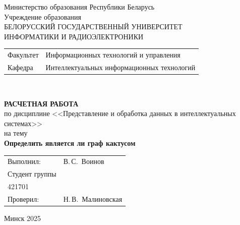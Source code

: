 \begin{titlepage}
  \begin{center}
    Министерство образования Республики Беларусь\\[1em]
    Учреждение образования\\
    БЕЛОРУССКИЙ ГОСУДАРСТВЕННЫЙ УНИВЕРСИТЕТ \\
    ИНФОРМАТИКИ И РАДИОЭЛЕКТРОНИКИ\\[1em]

    \begin{minipage}{\textwidth}
      \begin{flushleft}
        \begin{tabular}{ l l }
          Факультет & Информационных технологий и управления\\
          Кафедра   & Интеллектуальных информационных технологий
        \end{tabular}
      \end{flushleft}
    \end{minipage}\\[1em]

    \vspace{5em}


    \textbf{РАСЧЕТНАЯ РАБОТА}\\
    {по дисциплине <<Представление и обработка данных в интеллектуальных системах>>}\\
    на тему\\
    \textbf{\large Определить является ли граф кактусом}\\[1em]

    \vspace{10em}
    
    \begin{tabular}{ p{}p{} }
      Выполнил:& В.\,С.~Воинов \\[1em]
      Студент группы& \\
      421701 & \\
      Проверил: & Н.\,В.~Малиновская \\
     
    \end{tabular}
    
    \vfill
    {\normalsize Минск 2025}
  \end{center}
\end{titlepage}
